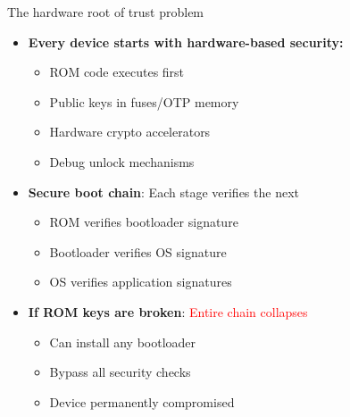\documentclass[aspectratio=169, lualatex, handout]{beamer}
\begin{document}
\begin{frame}{The hardware root of trust problem}
	\begin{itemize}
		\item \textbf{Every device starts with hardware-based security:}
		      \begin{itemize}
			      \item ROM code executes first
			      \item Public keys in fuses/OTP memory
			      \item Hardware crypto accelerators
			      \item Debug unlock mechanisms
		      \end{itemize}
		\item \textbf{Secure boot chain}: Each stage verifies the next
		      \begin{itemize}
			      \item ROM verifies bootloader signature
			      \item Bootloader verifies OS signature
			      \item OS verifies application signatures
		      \end{itemize}
		\item \textbf{If ROM keys are broken}: \textcolor{red}{Entire chain collapses}
		      \begin{itemize}
			      \item Can install any bootloader
			      \item Bypass all security checks
			      \item Device permanently compromised
		      \end{itemize}
	\end{itemize}
\end{frame}
\end{document}
